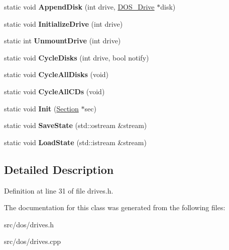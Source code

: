 \begin{DoxyCompactItemize}
\item 
\hypertarget{classDriveManager_a54920d4970b96e29957472859ad4bead}{static void {\bfseries Append\-Disk} (int drive, \hyperlink{classDOS__Drive}{D\-O\-S\-\_\-\-Drive} $\ast$disk)}\label{classDriveManager_a54920d4970b96e29957472859ad4bead}

\item 
\hypertarget{classDriveManager_a1d0f6529b0092f7b7a466743cbd2f99f}{static void {\bfseries Initialize\-Drive} (int drive)}\label{classDriveManager_a1d0f6529b0092f7b7a466743cbd2f99f}

\item 
\hypertarget{classDriveManager_af6bdeda1b4db20820d7b62a30b6e1b10}{static int {\bfseries Unmount\-Drive} (int drive)}\label{classDriveManager_af6bdeda1b4db20820d7b62a30b6e1b10}

\item 
\hypertarget{classDriveManager_a78a43ccb050064485d7a5ca7434b7e86}{static void {\bfseries Cycle\-Disks} (int drive, bool notify)}\label{classDriveManager_a78a43ccb050064485d7a5ca7434b7e86}

\item 
\hypertarget{classDriveManager_a8d9b7ba9258ddf571eaa1c5bf6c6dfc8}{static void {\bfseries Cycle\-All\-Disks} (void)}\label{classDriveManager_a8d9b7ba9258ddf571eaa1c5bf6c6dfc8}

\item 
\hypertarget{classDriveManager_a4fdec5341d5d213604abdc4d138ea93c}{static void {\bfseries Cycle\-All\-C\-Ds} (void)}\label{classDriveManager_a4fdec5341d5d213604abdc4d138ea93c}

\item 
\hypertarget{classDriveManager_a20f4d4a88de291bb80cce1c9e095af21}{static void {\bfseries Init} (\hyperlink{classSection}{Section} $\ast$sec)}\label{classDriveManager_a20f4d4a88de291bb80cce1c9e095af21}

\item 
\hypertarget{classDriveManager_a905c2094d650f6774eee3ef45bd838f8}{static void {\bfseries Save\-State} (std\-::ostream \&stream)}\label{classDriveManager_a905c2094d650f6774eee3ef45bd838f8}

\item 
\hypertarget{classDriveManager_ac41b944c4e633c7f3553666e59766611}{static void {\bfseries Load\-State} (std\-::istream \&stream)}\label{classDriveManager_ac41b944c4e633c7f3553666e59766611}

\end{DoxyCompactItemize}


\subsection{Detailed Description}


Definition at line 31 of file drives.\-h.



The documentation for this class was generated from the following files\-:\begin{DoxyCompactItemize}
\item 
src/dos/drives.\-h\item 
src/dos/drives.\-cpp\end{DoxyCompactItemize}
